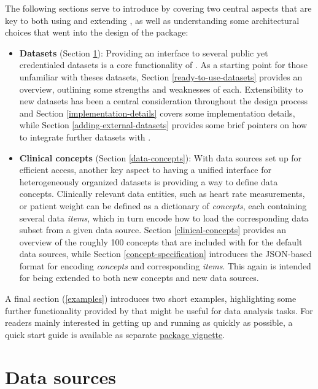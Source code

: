\documentclass[
  notitle]{jss}
\begin{document}
The following sections serve to introduce  by covering two
central aspects that are key to both using and extending , as
well as understanding some architectural choices that went into the
design of the package:

\begin{itemize}
\item
  \textbf{Datasets} (Section \ref{data-sources}): Providing an interface
  to several public yet credentialed datasets is a core functionality of
  . As a starting point for those unfamiliar with theses
  datasets, Section \ref{ready-to-use-datasets} provides an overview,
  outlining some strengths and weaknesses of each. Extensibility to new
  datasets has been a central consideration throughout the design
  process and Section \ref{implementation-details} covers some
  implementation details, while Section \ref{adding-external-datasets}
  provides some brief pointers on how to integrate further datasets with
  .
\item
  \textbf{Clinical concepts} (Section \ref{data-concepts}): With data
  sources set up for efficient access, another key aspect to having a
  unified interface for heterogeneously organized datasets is providing
  a way to define data concepts. Clinically relevant data entities, such
  as heart rate measurements, or patient weight can be defined as a
  dictionary of \emph{concepts}, each containing several data
  \emph{items}, which in turn encode how to load the corresponding data
  subset from a given data source. Section \ref{clinical-concepts}
  provides an overview of the roughly 100 concepts that are included
  with  for the default data sources, while Section
  \ref{concept-specification} introduces the JSON-based format for
  encoding \emph{concepts} and corresponding \emph{items}. This again is
  intended for being extended to both new concepts and new data sources.
\end{itemize}

A final section (\ref{examples}) introduces two short examples,
highlighting some further functionality provided by  that
might be useful for data analysis tasks. For readers mainly interested
in getting up and running as quickly as possible, a quick start guide is
available as separate
\href{https://CRAN.R-project.org/package=ricu/vignettes/ricu.html}{package
vignette}.

\hypertarget{data-sources}{%
\section{Data sources}\label{data-sources}}
\end{document}

